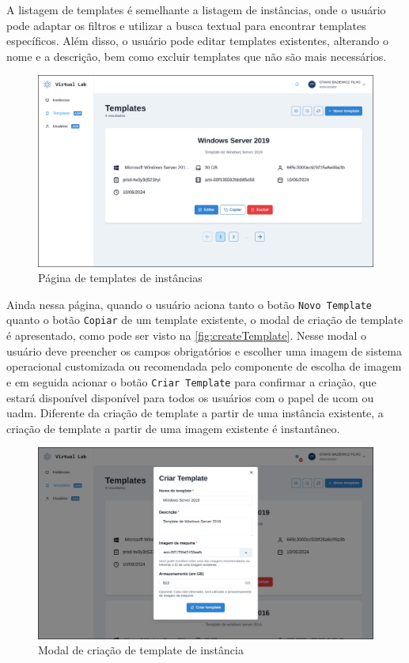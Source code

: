 A listagem de templates é semelhante a listagem de instâncias, onde o usuário pode adaptar os filtros e utilizar a busca textual para encontrar templates específicos. Além disso, o usuário pode editar templates existentes, alterando o nome e a descrição, bem como excluir templates que não são mais necessários.

\begin{figure}[H]
\caption{Página de templates de instâncias}
\label{fig:templatesPage}
\includegraphics[width=\textwidth]{capitulos/3-resultados/files/templates.png}
\end{figure}

Ainda nessa página, quando o usuário aciona tanto o botão \texttt{Novo Template} quanto o botão \texttt{Copiar} de um template existente, o modal de criação de template é apresentado, como pode ser visto na \autoref{fig:createTemplate}. Nesse modal o usuário deve preencher os campos obrigatórios e escolher uma imagem de sistema operacional customizada ou recomendada pelo componente de escolha de imagem e em seguida acionar o botão \texttt{Criar Template} para confirmar a criação, que estará disponível disponível para todos os usuários com o papel de \gls{ucom} ou \gls{uadm}. Diferente da criação de template a partir de uma instância existente, a criação de template a partir de uma imagem existente é instantâneo.

\begin{figure}[H]
\caption{Modal de criação de template de instância}
\label{fig:createTemplate}
\includegraphics[width=\textwidth]{capitulos/3-resultados/files/create-template.png}
\end{figure}

